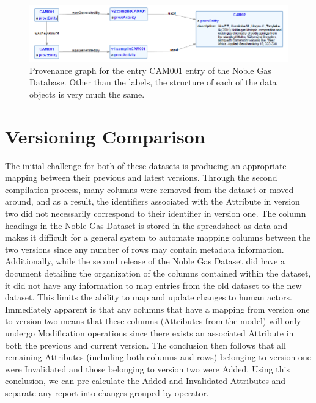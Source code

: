 \begin{figure}
	\centering
	\includegraphics[scale=0.70]{figures/CAM001v1v2.png}
	\caption{Provenance graph for the entry CAM001 entry of the Noble Gas Database.  Other than the labels, the structure of each of the data objects is very much the same.}
	\label{CAM001ProvGraph}
\end{figure}

\section{Versioning Comparison}

The initial challenge for both of these datasets is producing an appropriate mapping between their previous and latest versions.  Through the second compilation process, many columns were removed from the dataset or moved around, and as a result, the identifiers associated with the Attribute in version two did not necessarily correspond to their identifier in version one.  The column headings in the Noble Gas Dataset is stored in the spreadsheet as data and makes it difficult for a general system to automate mapping columns between the two versions since any number of rows may contain metadata information.  Additionally, while the second release of the Noble Gas Dataset did have a document detailing the organization of the columns contained within the dataset, it did not have any information to map entries from the old dataset to the new dataset.  This limits the ability to map and update changes to human actors.  Immediately apparent is that any columns that have a mapping from version one to version two means that these columns (Attributes from the model) will only undergo Modification operations since there exists an associated Attribute in both the previous and current version.  The conclusion then follows that all remaining Attributes (including both columns and rows) belonging to version one were Invalidated and those belonging to version two were Added.  Using this conclusion, we can pre-calculate the Added and Invalidated Attributes and separate any report into changes grouped by operator.

